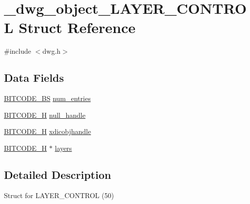 \hypertarget{struct__dwg__object__LAYER__CONTROL}{\section{\-\_\-dwg\-\_\-object\-\_\-\-L\-A\-Y\-E\-R\-\_\-\-C\-O\-N\-T\-R\-O\-L \-Struct \-Reference}
\label{struct__dwg__object__LAYER__CONTROL}
}


{\ttfamily \#include $<$dwg.\-h$>$}

\subsection*{\-Data \-Fields}
\begin{DoxyCompactItemize}
\item 
\hyperlink{dwg_8h_a94297606fbd4a4ff97e8add284af0809}{\-B\-I\-T\-C\-O\-D\-E\-\_\-\-B\-S} \hyperlink{struct__dwg__object__LAYER__CONTROL_a8010fa49b325e91c14abd01809da7ec8}{num\-\_\-entries}
\item 
\hyperlink{dwg_8h_a7c700e94e047a97ba8c24bdfe4029dc3}{\-B\-I\-T\-C\-O\-D\-E\-\_\-\-H} \hyperlink{struct__dwg__object__LAYER__CONTROL_a91f0eaf9e1689a8786559ec34f148139}{null\-\_\-handle}
\item 
\hyperlink{dwg_8h_a7c700e94e047a97ba8c24bdfe4029dc3}{\-B\-I\-T\-C\-O\-D\-E\-\_\-\-H} \hyperlink{struct__dwg__object__LAYER__CONTROL_ae6a8fbce45e2e38dd21ec51223fcbbe3}{xdicobjhandle}
\item 
\hyperlink{dwg_8h_a7c700e94e047a97ba8c24bdfe4029dc3}{\-B\-I\-T\-C\-O\-D\-E\-\_\-\-H} $\ast$ \hyperlink{struct__dwg__object__LAYER__CONTROL_a25b8de67fb0941780a804293b38285d0}{layers}
\end{DoxyCompactItemize}


\subsection{\-Detailed \-Description}
\-Struct for \-L\-A\-Y\-E\-R\-\_\-\-C\-O\-N\-T\-R\-O\-L (50) 

